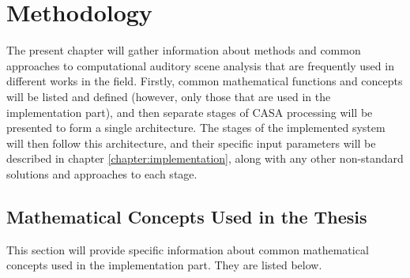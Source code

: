 \chapter{Methodology}\label{chapter:methodology}

The present chapter will gather information about methods and common approaches to computational auditory scene analysis that are frequently used in different works in the field. Firstly, common mathematical functions and concepts will be listed and defined (however, only those that are used in the implementation part), and then separate stages of CASA processing will be presented to form a single architecture. The stages of the implemented system will then follow this architecture, and their specific input parameters will be described in chapter \ref{chapter:implementation}, along with any other non-standard solutions and approaches to each stage.

\section{Mathematical Concepts Used in the Thesis}\label{section:math_concepts}

This section will provide specific information about common mathematical concepts used in the implementation part. They are listed below.

